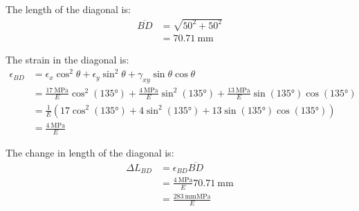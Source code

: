 The length of the diagonal is:
\begin{align*}
    \overline{BD} &= \sqrt{50^2 + 50^2} \\
    &= \qty{70.71}{\milli\meter}
\end{align*}

The strain in the diagonal is:
\begin{align*}
    \epsilon_{BD} &= \epsilon_x\cos^2\theta + \epsilon_y\sin^2\theta + \gamma_{xy}\sin\theta\cos\theta \\
    &= \frac{\qty{17}{\mega\pascal}}{E}\cos^2(\ang{135}) + \frac{\qty{4}{\mega\pascal}}{E}\sin^2(\ang{135}) + \frac{\qty{13}{\mega\pascal}}{E}\sin(\ang{135})\cos(\ang{135}) \\
    &= \frac{1}{E}(17\cos^2(\ang{135}) + 4\sin^2(\ang{135}) + 13\sin(\ang{135})\cos(\ang{135})) \\
    &= \frac{\qty{4}{\mega\pascal}}{E}
\end{align*}

The change in length of the diagonal is:
\begin{align*}
    \Delta L_{BD} &= \epsilon_{BD}\overline{BD} \\
    &= \frac{\qty{4}{\mega\pascal}}{E}\qty{70.71}{\milli\meter} \\
    &= \boxed{\frac{\qty{283}{\milli\meter\mega\pascal}}{E}}
\end{align*}